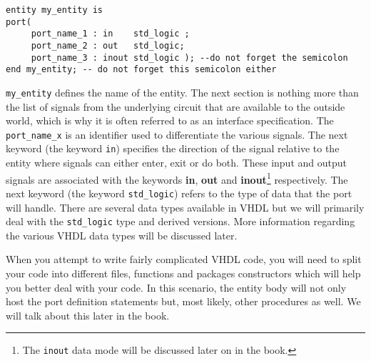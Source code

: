 \noindent
\begin{minipage}{0.99\linewidth}
\begin{lstlisting}[label=entity_basic, caption=The entity declaration in VHDL., mathescape=true]
entity my_entity is
port(
     port_name_1 : in    std_logic ;
     port_name_2 : out   std_logic;
     port_name_3 : inout std_logic ); --do not forget the semicolon
end my_entity; -- do not forget this semicolon either
\end{lstlisting}
\end{minipage}

\texttt{my\_entity} defines the name of the entity. The next section is nothing more than the list of signals from the underlying circuit that are available to the outside world, which is why it is often referred to as an interface specification. The \texttt{port\_name\_x} is an identifier used to differentiate the various signals. The next keyword (the keyword \texttt{in}) specifies the direction of the signal relative to the entity where signals can either enter, exit or do both. These input and output signals are associated with the keywords \textbf{in}, \textbf{out} and \textbf{inout}\footnote{The \texttt{inout} data mode will be discussed later on in the book.} respectively. The next keyword (the keyword \texttt{std\_logic}) refers to the type of data that the port will handle. There are several data types available in VHDL but we will primarily deal with the \texttt{std\_logic} type and derived versions. More information regarding the various VHDL data types will be discussed later.

When you attempt to write fairly complicated VHDL code, you will need to split your code into different files, functions and packages constructors which will help you better deal with your code. In this scenario, the entity body will not only host the port definition statements but, most likely, other procedures as well. We will talk about this later in the book.


